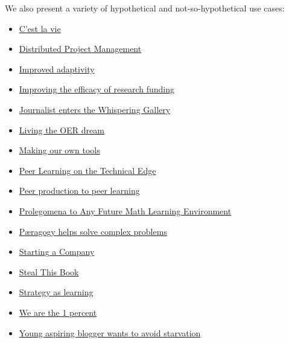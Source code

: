 We also present a variety of hypothetical and not-so-hypothetical use
cases:

\begin{itemize}
\item
  \href{http://peeragogy.org/use-cases/cest-la-vie/}{C'est la vie}
\item
  \href{http://peeragogy.org/use-cases/distributed-project-management/}{Distributed
  Project Management}
\item
  \href{http://peeragogy.org/use-cases/improved-adaptivity/}{Improved
  adaptivity}
\item
  \href{http://peeragogy.org/use-cases/improving-the-efficacy-of-research-funding/}{Improving
  the efficacy of research funding}
\item
  \href{http://peeragogy.org/use-cases/journalist-enters-the-whispering-gallery/}{Journalist
  enters the Whispering Gallery}
\item
  \href{http://peeragogy.org/use-cases/living-the-oer-dream/}{Living the
  OER dream}
\item
  \href{http://peeragogy.org/use-cases/making-our-own-tools/}{Making our
  own tools}
\item
  \href{http://peeragogy.org/use-cases/peer-learning-on-the-technical-edge/}{Peer
  Learning on the Technical Edge}
\item
  \href{http://peeragogy.org/use-cases/from-peer-production-to-peer-learning/}{Peer
  production to peer learning}
\item
  \href{http://peeragogy.org/use-cases/prolegomena-to-any-future-math-learning-environment/}{Prolegomena
  to Any Future Math Learning Environment}
\item
  \href{http://peeragogy.org/use-cases/paeragogy-helps-solve-complex-problems/}{Pæragogy
  helps solve complex problems}
\item
  \href{http://peeragogy.org/use-cases/starting-a-company/}{Starting a
  Company}
\item
  \href{http://peeragogy.org/use-cases/steal-this-book/}{Steal This
  Book}
\item
  \href{http://peeragogy.org/use-cases/strategy-as-learning/}{Strategy
  as learning}
\item
  \href{http://peeragogy.org/use-cases/we-are-the-1-percent/}{We are the
  1 percent}
\item
  \href{http://peeragogy.org/use-cases/young-aspiring-blogger-wants-to-avoid-starvation/}{Young
  aspiring blogger wants to avoid starvation}
\end{itemize}
